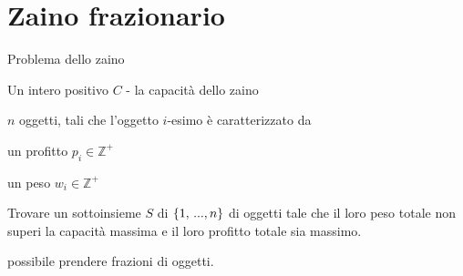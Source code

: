 \section{Zaino frazionario}

\begin{frame}{Problema dello zaino}

\vspace{-6pt}
\begin{myboxtitle}[Input]
\BIL
\item Un intero positivo $C$  - la capacità dello zaino
\item $n$ oggetti, tali che l'oggetto $i$-esimo è caratterizzato da
  \BI
	\item un profitto $p_i \in \mathbb{Z^+}$  
  \item un peso $w_i \in \mathbb{Z^+}$
	\EI
\EIL
\end{myboxtitle}

	
\begin{myboxtitle}[Zaino 0/1]
Trovare un sottoinsieme $S$ di $\{1, \mydots , n\}$ di oggetti tale che il loro
peso totale non superi la capacità massima e il loro profitto totale sia
massimo.
\end{myboxtitle}

\begin{myboxtitle}
\EE possibile prendere frazioni di oggetti.
\end{myboxtitle}

\end{frame}

